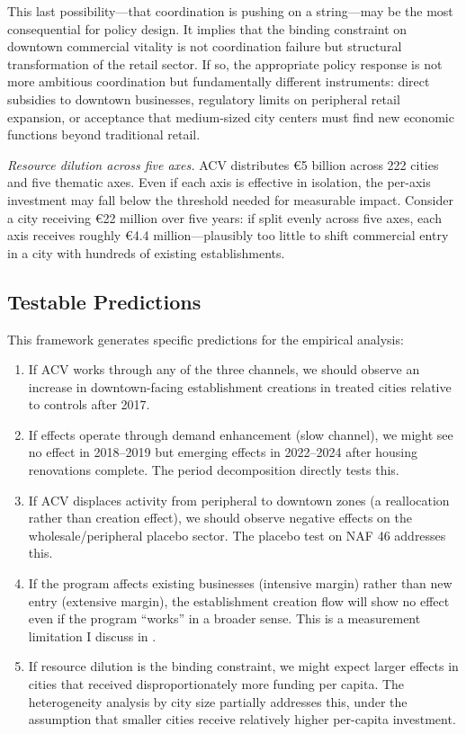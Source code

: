 \documentclass[12pt]{article}
\begin{document}
This last possibility---that coordination is pushing on a string---may be the most consequential for policy design. It implies that the binding constraint on downtown commercial vitality is not coordination failure but structural transformation of the retail sector. If so, the appropriate policy response is not more ambitious coordination but fundamentally different instruments: direct subsidies to downtown businesses, regulatory limits on peripheral retail expansion, or acceptance that medium-sized city centers must find new economic functions beyond traditional retail.

\textit{Resource dilution across five axes.} ACV distributes \euro 5 billion across 222 cities and five thematic axes. Even if each axis is effective in isolation, the per-axis investment may fall below the threshold needed for measurable impact. Consider a city receiving \euro 22 million over five years: if split evenly across five axes, each axis receives roughly \euro 4.4 million---plausibly too little to shift commercial entry in a city with hundreds of existing establishments.

\subsection{Testable Predictions}

This framework generates specific predictions for the empirical analysis:

\begin{enumerate}
    \item If ACV works through any of the three channels, we should observe an increase in downtown-facing establishment creations in treated cities relative to controls after 2017.
    \item If effects operate through demand enhancement (slow channel), we might see no effect in 2018--2019 but emerging effects in 2022--2024 after housing renovations complete. The period decomposition directly tests this.
    \item If ACV displaces activity from peripheral to downtown zones (a reallocation rather than creation effect), we should observe negative effects on the wholesale/peripheral placebo sector. The placebo test on NAF 46 addresses this.
    \item If the program affects existing businesses (intensive margin) rather than new entry (extensive margin), the establishment creation flow will show no effect even if the program ``works'' in a broader sense. This is a measurement limitation I discuss in .
    \item If resource dilution is the binding constraint, we might expect larger effects in cities that received disproportionately more funding per capita. The heterogeneity analysis by city size partially addresses this, under the assumption that smaller cities receive relatively higher per-capita investment.
\end{enumerate}
\end{document}
